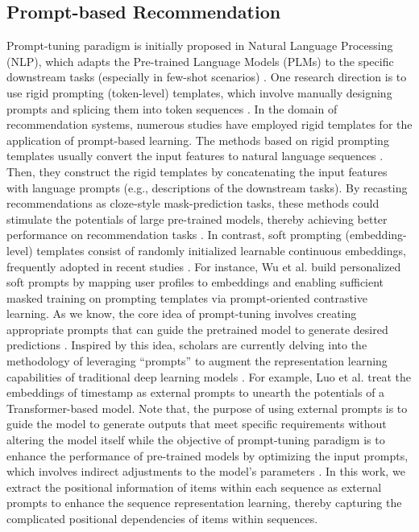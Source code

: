 \subsection{Prompt-based Recommendation}
\noindent Prompt-tuning paradigm is initially proposed in Natural Language Processing (NLP), which adapts the Pre-trained Language Models (PLMs) to the specific downstream tasks (especially in few-shot scenarios) \cite{LiuJFTDY022,BrownMRSKDNSSAA20}.
One research direction is to use rigid prompting (token-level) templates, which involve manually designing prompts and splicing them into token sequences \cite{GuHLH22}. In the domain of recommendation systems, numerous studies have employed rigid templates for the application of prompt-based learning. The methods based on rigid prompting templates usually convert the input features to natural language sequences \cite{Geng0FGZ22, ShinRLWS20}. Then, they construct the rigid templates by concatenating the input features with language prompts (e.g., descriptions of the downstream tasks). By recasting recommendations as cloze-style mask-prediction tasks, these methods could stimulate the potentials of large pre-trained models, thereby achieving better performance on recommendation tasks \cite{ZhangW23}.
In contrast, soft prompting (embedding-level) templates consist of randomly initialized learnable continuous embeddings, frequently adopted in recent studies \cite{WuXZZZLH24,BrownMRSKDNSSAA20, ZhangPrompt2023}. For instance, Wu et al. \cite{WuXZZZLH24} build personalized soft prompts by mapping user profiles to embeddings and enabling sufficient masked training on prompting templates via prompt-oriented contrastive learning.
As we know, the core idea of prompt-tuning involves creating appropriate prompts that can guide the pretrained model to generate desired predictions \cite{Geng0FGZ22}. Inspired by this idea, scholars are currently delving into the methodology of leveraging “prompts” to augment the representation learning capabilities of traditional deep learning models \cite{dongPrompt2024, Luoprompt2023}. For example, Luo et al. \cite{Luoprompt2023} treat the embeddings of timestamp as external prompts to unearth the potentials of a Transformer-based model. Note that, the purpose of using external prompts is to guide the model to generate outputs that meet specific requirements without altering the model itself \cite{Luoprompt2023} while the objective of prompt-tuning paradigm is to enhance the performance of pre-trained models by optimizing the input prompts, which involves indirect adjustments to the model's parameters \cite{dongPrompt2024}. In this work, we extract the positional information of items within each sequence as external prompts to enhance the sequence representation learning, thereby capturing the complicated positional dependencies of items within sequences.


